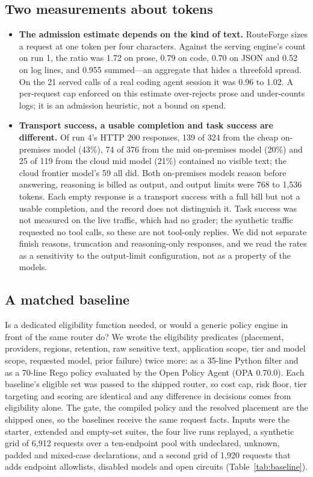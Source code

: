 \documentclass[11pt]{article}
\newcommand{\ubreak}{\textunderscore\allowbreak}
\newcommand{\code}[1]{{\ttfamily\let\_\ubreak #1}}
\begin{document}
\subsection{Two measurements about tokens}
\label{sec:tokens}

\begin{itemize}
  \item \textbf{The admission estimate depends on the kind of text.} RouteForge sizes a request
    at one token per four characters. Against the serving engine's count on run 1, the ratio was
    1.72 on prose, 0.79 on code, 0.70 on JSON and 0.52 on log lines, and 0.955 summed---an
    aggregate that hides a threefold spread. On the 21 served calls of a real coding agent
    session it was 0.96 to 1.02. A per-request cap enforced on this estimate over-rejects prose
    and under-counts logs; it is an admission heuristic, not a bound on spend.
  \item \textbf{Transport success, a usable completion and task success are different.} Of
    run 4's HTTP 200 responses, 139 of 324 from the cheap on-premises model (43\%), 74 of 376
    from the mid on-premises model (20\%) and 25 of 119 from the cloud mid model (21\%) contained
    no visible text; the cloud frontier model's 59 all did. Both on-premises models reason before
    answering, reasoning is billed as output, and output limits were 768 to 1{,}536 tokens. Each
    empty response is a transport success with a full bill but not a usable completion, and the
    record does not distinguish it. Task success was not measured on the live traffic, which had
    no grader; the synthetic traffic requested no tool calls, so these are not tool-only replies.
    We did not separate finish reasons, truncation and reasoning-only responses, and we read the
    rates as a sensitivity to the output-limit configuration, not as a property of the models.
\end{itemize}

\subsection{A matched baseline}
\label{sec:baseline}

Is a dedicated eligibility function needed, or would a generic policy engine in front of the
same router do? We wrote the eligibility predicates (placement, providers, regions, retention,
raw sensitive text, application scope, tier and model scope, requested model, prior failure) twice
more: as a 35-line Python filter and as a 70-line Rego policy evaluated by the Open Policy Agent
(OPA 0.70.0). Each baseline's eligible set was passed to the shipped router, so cost cap, risk
floor, tier targeting and scoring are identical and any difference in decisions comes from
eligibility alone. The gate, the compiled policy and the resolved placement are the shipped
ones, so the baselines receive the same request facts. Inputs were the starter, extended and empty-set
suites, the four live runs replayed, a synthetic grid of 6{,}912 requests over a ten-endpoint
pool with undeclared, \code{unknown}, padded and mixed-case declarations, and a second grid of
1{,}920 requests that adds endpoint allowlists, disabled models and open circuits
(Table~\ref{tab:baseline}).
\end{document}
